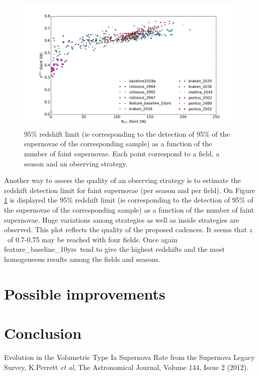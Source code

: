 \documentclass [11pt,a4paper]{article}
\newcommand{\feature}{feature\_baseline\_10yrs}
\newcommand{\redshift}{$z$}
\begin{document}
\begin{figure}[htbp]
\begin{center}
  
  \includegraphics[width=15cm]{Figures/Z95_NSN.png}
 \caption{95\% redshift limit (ie corresponding to the detection of 95\% of the supernovae of the corresponding sample) as a function of the number of faint supernovae. Each point correspond to a field, a season and an observing strategy.}\label{fig:z95}
\end{center}
\end{figure}

Another way to assess the quality of an observing strategy is to estimate the redshift detection limit for faint supernovae (per season and per field). On Figure \ref{fig:z95} is displayed the 95\% redshift limit (ie corresponding to the detection of 95\% of the supernovae of the corresponding sample) as a function of the number of faint supernovae. Huge variations among strategies as well as inside strategies are observed. This plot reflects the quality of the proposed cadences. It seems that \redshift~of 0.7-0.75 may be reached with four fields. Once again \feature~tend to give the highest redshifts and the most homogeneous results among the fields and seasons. 

\section{ Possible improvements}

\section{ Conclusion}

\begin{thebibliography}{9}
 Evolution in the Volumetric Type Ia Supernova Rate from the Supernova Legacy Survey, K.Perrett {\it et al}, The Astronomical Journal, Volume 144, Issue 2 (2012).
  
 \end{thebibliography}
\end{document}
